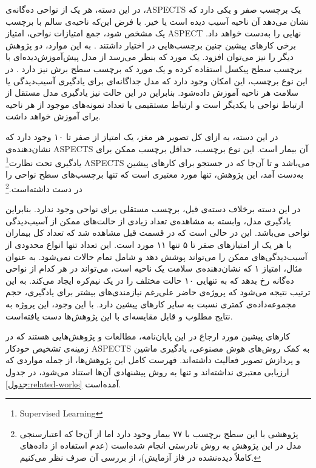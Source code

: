 در این دسته، 
هر یک از نواحی ده‌گانه‌ی ،ASPECTS
یک برچسب صفر و یکی دارد که نشان می‌دهد آن ناحیه آسیب دیده است یا خیر.
با فرض این‌که ناحیه‌ی سالم با برچسب یک مشخص شود، جمع امتیازات نواحی، امتیاز ASPECT نهایی را به‌دست خواهد داد.
برخی کار‌های پیشین
چنین برچسب‌هایی در اختیار داشتند \cite{lee2023clinical,jung2018evaluating,kuang2019automated}.
به این موارد، دو پژوهش دیگر را نیز می‌توان افزود.
یک مورد که بنظر می‌رسد از مدل پیش‌آموزش‌دیده‌ای با برچسب سطح پیکسل استفاده کرده 
\cite{naganuma2021alberta}
و یک مورد که برچسب سطح برش نیز دارد \cite{chiang2022deep}.
در این نوع برچسب، این امکان وجود دارد که مدل جداگانه‌ای برای یادگیری
آسیب‌دیدگی یا سلامت هر ناحیه آموزش داده‌شود.
بنابراین در این حالت نیز یادگیری مدل مستقل از ارتباط نواحی با یکدیگر است و ارتباط مستقیمی با تعداد نمونه‌های موجود از هر ناحیه برای آموزش خواهد داشت.

در این دسته، به ازای کل تصویر هر مغز، 
یک امتیاز از صفر تا ۱۰ وجود دارد که نشان‌دهنده‌ی ASPECTS آن بیمار است.
این نوع برچسب، حداقل برچسب ممکن برای 
یادگیری تحت نظارت\footnote{Supervised Learning} 
ASPECTS می‌باشد و
تا آن‌جا که در جستجو برای کار‌های پیشین به‌دست آمد، این پژوهش، تنها مورد معتبری
است که تنها برچسب‌های سطح نواحی را در دست داشته‌است.\footnote{پژوهشی با این سطح برچسب با ۷۷ بیمار وجود دارد 
\cite{golkonda2022automated}
اما از آن‌جا که اعتبارسنجی مدل در این پژوهش به روش نادرستی انجام شده‌است (عدم استفاده از داده‌های کاملاً دیده‌نشده در فاز آزمایش)، از بررسی آن صرف نظر می‌کنیم.}

در این دسته برخلاف دسته‌ی قبل، برچسب  مستقلی برای نواحی وجود ندارد.
بنابراین 
یادگیری مدل، وابسته به مشاهده‌ی تعداد زیادی از حالت‌های ممکن از آسیب‌دیدگی نواحی می‌باشد.
این در حالی است که در قسمت قبل مشاهده شد که تعداد کل بیماران با هر یک از امتیازهای صفر تا ۵ تنها ۱۱ مورد است.
این تعداد تنها انواع محدودی از آسیب‌دیدگی‌های ممکن را می‌تواند پوشش دهد و شامل تمام حالات نمی‌شود. 
به عنوان مثال، امتیاز ۱ که نشان‌دهنده‌ی سلامت یک ناحیه است، می‌تواند در هر کدام از نواحی ده‌گانه رخ بدهد که به تنهایی ۱۰ حالت مختلف را در یک نیم‌کره ایجاد می‌کند. 
به این ترتیب نتیجه می‌شود که پروژه‌ی حاضر علی‌رغم نیازمندی‌های بیشتر برای یادگیری، حجم مجموعه‌داده‌ی کمتری نسبت به سایر کار‌های پیشین دارد.
با این وجود، این پروژه به نتایج مطلوب و قابل مقایسه‌ای با این پژوهش‌ها دست یافته‌است.



کار‌های پیشین مورد ارجاع در این پایان‌نامه، مطالعات و پژوهش‌هایی هستند که 
در زمینه‌ی تشخیص خودکار ASPECTS به کمک روش‌های هوش مصنوعی، یادگیری ماشین و پردازش تصویر فعالیت داشته‌اند.
فهرست کامل این پژوهش‌ها، از جمله مواردی که ارزیابی معتبری نداشته‌اند و تنها به روش پیشنهادی آن‌ها استناد می‌شود، در جدول 
\ref{جدول:related-works}
آمده‌است.

